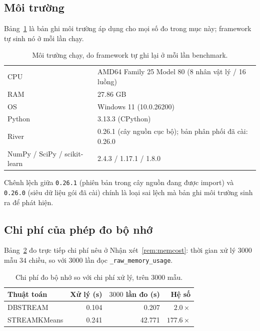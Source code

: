 \documentclass[11pt,a4paper]{article}
\theoremstyle{remark}
\begin{document}
\subsection{Môi trường}

Bảng~\ref{tab:env} là bản ghi môi trường áp dụng cho mọi số đo trong mục này;
framework tự sinh nó ở mỗi lần chạy.

\begin{table}[htbp]
\centering
\small
\caption{Môi trường chạy, do framework tự ghi lại ở mỗi lần benchmark.}
\label{tab:env}
\begin{tabular}{@{}ll@{}}
\toprule
CPU & AMD64 Family 25 Model 80 (8 nhân vật lý / 16 luồng) \\
RAM & 27.86 GB \\
OS & Windows 11 (10.0.26200) \\
Python & 3.13.3 (CPython) \\
River & 0.26.1 (cây nguồn cục bộ); bản phân phối đã cài: 0.26.0 \\
NumPy / SciPy / scikit-learn & 2.4.3 / 1.17.1 / 1.8.0 \\
\bottomrule
\end{tabular}
\end{table}

Chênh lệch giữa \texttt{0.26.1} (phiên bản trong cây nguồn đang được import) và
\texttt{0.26.0} (siêu dữ liệu gói đã cài) chính là loại sai lệch mà bản ghi môi
trường sinh ra để phát hiện.

\subsection{Chi phí của phép đo bộ nhớ}
\label{sec:memcost-res}

Bảng~\ref{tab:memcost} đo trực tiếp chi phí nêu ở Nhận xét~\ref{rem:memcost}:
thời gian xử lý $3000$ mẫu $34$ chiều, so với $3000$ lần đọc
\texttt{\_raw\_memory\_usage}.

\begin{table}[htbp]
\centering
\small
\caption{Chi phí đo bộ nhớ so với chi phí xử lý, trên $3000$ mẫu.}
\label{tab:memcost}
\begin{tabular}{@{}lrrr@{}}
\toprule
\textbf{Thuật toán} & \textbf{Xử lý (s)} & \textbf{$3000$ lần đo (s)} & \textbf{Hệ số} \\
\midrule
DBSTREAM      & 0.104 & 0.207  & $2.0\times$ \\
STREAMKMeans  & 0.241 & 42.771 & $\mathbf{177.6\times}$ \\
\bottomrule
\end{tabular}
\end{table}
\end{document}
